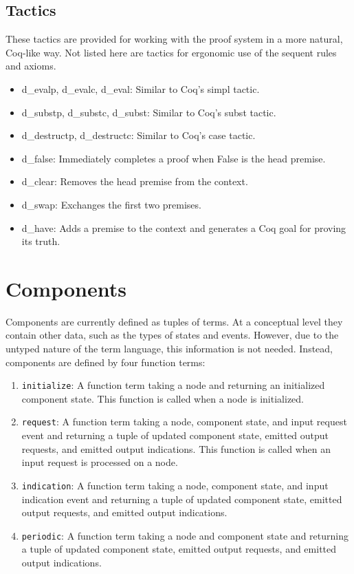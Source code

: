 \documentclass[12pt]{article}
\begin{document}
\subsection{Tactics}

These tactics are provided for working with the proof system in a more
natural, Coq-like way.  Not listed here are tactics for ergonomic use of
the sequent rules and axioms.

\begin{itemize}

  \item d\_evalp, d\_evalc, d\_eval: Similar to Coq's simpl tactic.
  \item d\_substp, d\_substc, d\_subst: Similar to Coq's subst tactic.
  \item d\_destructp, d\_destructc: Similar to Coq's case tactic.
  \item d\_false: Immediately completes a proof when False is the head
    premise.
  \item d\_clear: Removes the head premise from the context.
  \item d\_swap: Exchanges the first two premises.
  \item d\_have: Adds a premise to the context and generates a Coq goal
    for proving its truth.

\end{itemize}

\section{Components}

Components are currently defined as tuples of terms.  At a conceptual
level they contain other data, such as the types of states and events.
However, due to the untyped nature of the term language, this
information is not needed.  Instead, components are defined by four
function terms:

\begin{enumerate}

  \item \texttt{initialize}: A function term taking a node and returning
    an initialized component state.  This function is called when a node
    is initialized.

  \item \texttt{request}: A function term taking a node, component
    state, and input request event and returning a tuple of updated
    component state, emitted output requests, and emitted output
    indications.  This function is called when an input request is
    processed on a node.

  \item \texttt{indication}: A function term taking a node, component
    state, and input indication event and returning a tuple of updated
    component state, emitted output requests, and emitted output
    indications.

  \item \texttt{periodic}: A function term taking a node and component
    state and returning a tuple of updated component state, emitted
    output requests, and emitted output indications.

\end{enumerate}
\end{document}
